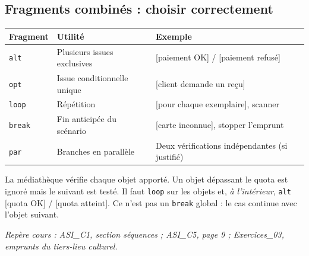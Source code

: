 \documentclass[10pt,a4paper]{article}
\newcommand{\source}[1]{\par{\footnotesize\color{bodygray}\textit{Repère cours : #1}}}
\begin{document}
\begin{center}
\end{center}
\subsection{Fragments combinés : choisir correctement}
\begin{tabularx}{\linewidth}{@{}p{18mm}p{35mm}X@{}}
\toprule
Fragment & Utilité & Exemple \\
\midrule
\texttt{alt} & Plusieurs issues exclusives & [paiement OK] / [paiement refusé] \\
\texttt{opt} & Issue conditionnelle unique & [client demande un reçu] \\
\texttt{loop} & Répétition & [pour chaque exemplaire], scanner \\
\texttt{break} & Fin anticipée du scénario & [carte inconnue], stopper l'emprunt \\
\texttt{par} & Branches en parallèle & Deux vérifications indépendantes (si justifié) \\
\bottomrule
\end{tabularx}
\begin{exobox}
La médiathèque vérifie chaque objet apporté. Un objet dépassant le quota est ignoré mais le suivant est testé. Il faut \texttt{loop} sur les objets et, \emph{à l'intérieur}, \texttt{alt} [quota OK] / [quota atteint]. Ce n'est pas un \texttt{break} global : le cas continue avec l'objet suivant.
\end{exobox}
\source{ASI\_C1, section séquences ; ASI\_C5, page 9 ; Exercices\_03, emprunts du tiers-lieu culturel.}
\end{document}
